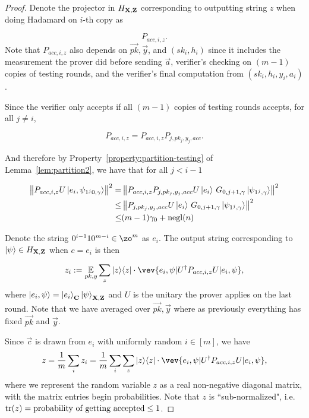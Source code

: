 \begin{proof}
Denote the projector in $H_{\mathbf{X},\mathbf{Z}}$ corresponding to outputting string $z$ when doing Hadamard on $i$-th copy as

$$P_{acc,i,z}.$$
Note that $P_{acc,i,z}$ also depends on $\vec{pk}, \vec{y}$, and $(sk_i, h_i)$ since it includes the measurement the prover did before sending $\vec{a}$,  verifier's checking on $(m-1)$ copies of testing rounds, and  the verifier's final computation from $(sk_i,h_i,y_i,a_i)$.

Since the verifier only accepts if all $(m-1)$ copies of testing rounds accepts, for all $j\neq i$,

$$P_{acc,i,z}=P_{acc,i,z}P_{j,pk_j,y_j,acc}.$$

And therefore by Property~\ref{property:partition-testing} of Lemma~\ref{lem:partition2}, we have that for all $j <i-1$   %

\begin{align} \label{eq:rejected-d}
    \left\lVert P_{acc,i,z} U \ket{e_i, \psi_{1^j0,\gamma}}\right\rVert^2
    =& \left\lVert P_{acc,i,z}P_{j,pk_j,y_j,acc} U \ket{e_i}\, G_{0,j+1,\gamma}\ket{\psi_{1^j,\gamma}}  \right\rVert^2 \nonumber \\
    \leq& \left\lVert P_{j,pk_j,y_j,acc} U \ket{e_i}\, G_{0,j+1,\gamma}\ket{\psi_{1^j,\gamma}}  \right\rVert^2 \nonumber \\
    \leq& (m-1)\gamma_0+\operatorname{negl}(n) 
\end{align}


Denote the string $0^{i-1}10^{m-i} \in \zo^m $ as $e_i$. The output string corresponding to $\ket{\psi} \in H_{\mathbf{X},\mathbf{Z}}$ when $c=e_i$ is then 




$$z_i\defeq \E_{pk,y} \sum_z \proj{z} \cdot \vev{e_i,\psi|U^\dag P_{acc,i,z} U|e_i,\psi},$$
where $\ket{e_i,\psi}=\ket{e_i}_{\mathbf{C}}\ket{\psi}_{\mathbf{X},\mathbf{Z}}$ and $U$ is the unitary the prover applies on the last round. Note that we have averaged over $\vec{pk}, \vec{y}$ where as previously everything has fixed $\vec{pk}$ and $\vec{y}$. 

Since $\vec{c}$ is drawn  from $e_i$ with uniformly random $i\in [m]$, we have 
$$ z=\frac{1}{m} \sum_i z_i= \frac{1}{m} \sum_i \sum_z \proj{z} \cdot \vev{e_i,\psi|U^\dag P_{acc,i,z} U|e_i,\psi},$$ 
	where we represent the random variable $z$ as a real non-negative diagonal matrix, with the matrix entries begin probabilities. Note that $z$ is ``sub-normalized", i.e. $\operatorname{tr} (z)= \text{probability of getting accepted} \leq 1$.







\end{proof}
